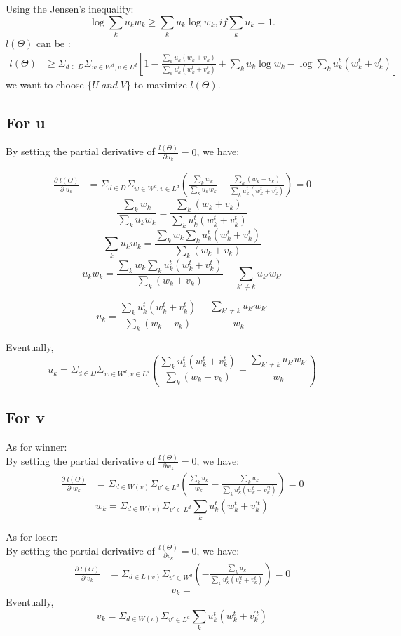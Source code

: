 \documentclass{article}
\begin{document}
Using the Jensen's inequality:
$$ \log \sum_k u_kw_k \geq \sum_k u_k \log w_k,if \sum_k u_k=1. $$ $l(\Theta)$ can be :
\begin{align}
l(\Theta)
& \geq \Sigma_{d \in D} \Sigma_{w\in W^d, v\in L^d} [1- \frac{\sum_k u_k(w_k+v_k)}{\sum_k u_k^t(w_k^t +v_k^t)}+ \sum_k u_k \log  w_k -\log \sum_k u_k^t (w_k^t+v_k^t)]
\end{align}
we want to choose $\{ U \; and \; V\}$ to maximize $ l(\Theta). $

\subsection{For u}


By setting the partial derivative of $\frac{l(\Theta)}{\partial u_k}=0$, we have:

\begin{align}
\frac{\partial \;l(\Theta) }{\partial \;u_k}
 &= \Sigma_{d \in D} \Sigma_{w\in W^d, v\in L^d}(\frac{\sum_k w_k}{\sum_k u_k w_k}-\frac{\sum_k(w_k+v_k)}{\sum_k u_k^t(w_k^t +v_k^t)}) =0
\end{align}
$$ \frac{\sum_k w_k}{\sum_k u_k w_k}=\frac{\sum_k(w_k+v_k)}{\sum_k u_k^t(w_k^t +v_k^t)}$$
$$ \sum_k u_k w_k =\frac{ \sum_k w_k \sum_k u_k^t(w_k^t +v_k^t)}{\sum_k(w_k+v_k)} $$
$$ u_k w_k  = \frac{\sum_k w_k \sum_k u_k^t(w_k^t +v_k^t)}{\sum_k(w_k+v_k)} -\sum_{k' \neq k} u_{k'} w_{k'} $$

$$ u_k = \frac{\sum_k u_k^t(w_k^t +v_k^t)}{\sum_k(w_k+v_k)} - \frac{\sum_{k' \neq k} u_{k'} w_{k'}}{w_k}$$

Eventually,
$$ u_k = \Sigma_{d \in D} \Sigma_{w\in W^d, v\in L^d}(\frac{\sum_k u_k^t(w_k^t +v_k^t)}{\sum_k(w_k+v_k)} - \frac{\sum_{k' \neq k} u_{k'} w_{k'}}{w_k})$$

\subsection{For v}

As for winner:\\
By setting the partial derivative of $\frac{l(\Theta)}{\partial w_k}=0$, we have:
\begin{align}
\frac{\partial \;l(\Theta)}{\partial \;w_k}
&=  \Sigma_{d \in W(v)} \Sigma_{v'\in L^d}(\frac{\sum_k u_k}{w_k}-\frac{\sum_k u_k}{\sum_k u_k^t(w_k^t +v_k^{'t})})=0
\end{align}
$$ w_k =\Sigma_{d \in W(v)} \Sigma_{v'\in L^d} \sum_k u_k^t(w_k^t +v_k^{'t}) $$

As for loser:\\
By setting the partial derivative of $\frac{l(\Theta)}{\partial v_k}=0$, we have:
\begin{align}
\frac{\partial \;l(\Theta)}{\partial \;v_k}
&=  \Sigma_{d \in L(v)} \Sigma_{v'\in W^d}(-\frac{\sum_k u_k}{\sum_k u_k^t(v_k^{'t} +v_k^t)})=0
\end{align}
$$ v_k =  $$
Eventually,
$$ v_k = \Sigma_{d \in W(v)} \Sigma_{v'\in L^d} \sum_k u_k^t(w_k^t +v_k^{'t}) $$
\end{document}
